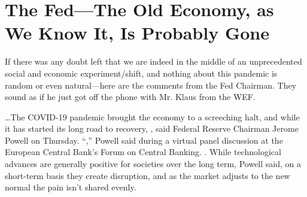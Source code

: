 \chapter{The Fed---The Old Economy, as We Know It, Is Probably Gone}

\begin{refsection}

If there was any doubt left that we are indeed in the middle of an unprecedented social and economic experiment/shift, and nothing about this pandemic is random or even natural---here are the comments from the Fed Chairman. They sound as if he just got off the phone with Mr. Klaus from the WEF.

\begin{tcolorbox}[quote]

\dots{}The COVID-19 pandemic brought the economy to a screeching halt, and while it has started its long road to recovery,\textsuperscript{\cite{urlc5540951}} , said Federal Reserve Chairman Jerome Powell\textsuperscript{\cite{url54312804}} on Thursday. \enquote{,} Powell said during a virtual panel discussion at the European Central Bank's Forum on Central Banking.\textsuperscript{\cite{urlef5b2a9e}} . While technological advances are generally positive for societies over the long term, Powell said, on a short-term basis they create disruption, and as the market adjusts to the new normal the pain isn't shared evenly.\textsuperscript{\cite{url3c0eee83}}

\end{tcolorbox}

\printbibliography[heading=subbibliography]

\end{refsection}